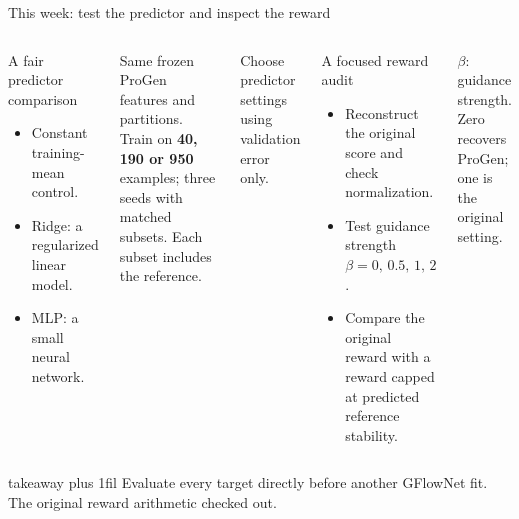 \documentclass[10pt,aspectratio=169]{beamer}
\newcommand{\takeaway}[1]{%
  \par\vspace{2mm}\vfill
  \begin{beamercolorbox}[wd=\textwidth,sep=2mm]{takeaway}
    \small\RaggedRight\leftskip=2mm\rightskip=2mm plus 1fil #1
  \end{beamercolorbox}
}
\begin{document}
\begin{frame}[t]{This week: test the predictor and inspect the reward}
\RaggedRight
\begin{columns}[T,onlytextwidth]
\RaggedRight
\begin{block}{A fair predictor comparison}
\begin{itemize}
\item Constant training-mean control.
\item Ridge: a regularized linear model.
\item MLP: a small neural network.
\end{itemize}
\end{block}
Same frozen ProGen features and partitions. Train on \textbf{40, 190 or 950}
examples; three seeds with matched subsets. Each subset includes the reference.

Choose predictor settings using validation error only.
\RaggedRight
\begin{block}{A focused reward audit}
\begin{itemize}
\item Reconstruct the original score and check normalization.
\item Test guidance strength $\beta=0,\,0.5,\,1,\,2$.
\item Compare the original reward with a reward capped at predicted reference stability.
\end{itemize}
\end{block}
$\beta$: guidance strength. Zero recovers ProGen; one is the original setting.
\end{columns}
\takeaway{Evaluate every target directly before another GFlowNet fit.
The original reward arithmetic checked out.}
\end{frame}
\end{document}
